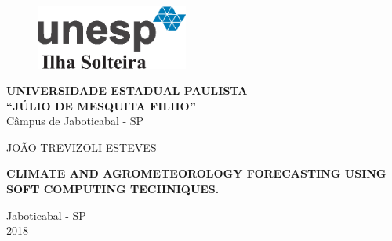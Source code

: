 \thispagestyle{empty}

\begin{figure}
\vspace{-0.4cm}
\includegraphics[width=5cm]{LogoUNESP.eps}
\end{figure}

\textbf{UNIVERSIDADE ESTADUAL PAULISTA}\\
\hspace*{1.3cm}\textbf{``JÚLIO DE MESQUITA FILHO''}\\
\hspace*{1.8cm} Câmpus de Jaboticabal - SP

\vspace{3.5cm}
\centerline{{\normalsize{JOÃO TREVIZOLI ESTEVES}}}

\vspace*{4.5cm}


\begin{center}
\Large\textrm{\textbf{CLIMATE AND AGROMETEOROLOGY FORECASTING USING SOFT COMPUTING TECHNIQUES.}} %
\end{center}


\vspace*{9.0cm}
\begin{center}
Jaboticabal - SP\\ 
2018
\end{center}

\newpage
